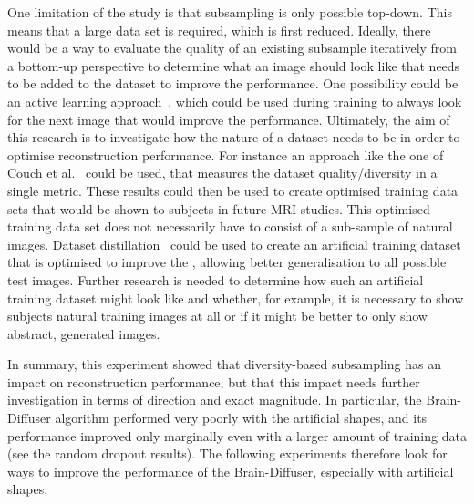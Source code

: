 One limitation of the study is that subsampling is only possible top-down. This means that a large data set is required, which is first reduced. Ideally, there would be a way to evaluate the quality of an existing subsample iteratively from a bottom-up perspective  to determine what an image should look like that needs to be added to the dataset to improve the performance. One possibility could be an active learning approach~\cite{senerActiveLearningConvolutional2018, guoDeepCoreComprehensiveLibrary2022}, which could be used during training to always look for the next image that would improve the performance. Ultimately, the aim of this research is to investigate how the nature of a dataset needs to be in order to optimise reconstruction performance. For instance an approach like the one of Couch et al.~\cite{couchSizeClassBalance2024} could be used, that measures the dataset quality/diversity in a single metric. These results could then be used to create optimised training data sets that would be shown to subjects in future MRI studies. This optimised training data set does not necessarily have to consist of a sub-sample of natural images. Dataset distillation~\cite{wangDatasetDistillation2018,yuDatasetDistillationComprehensive2024} could be used to create an artificial training dataset that is optimised to improve the , allowing better generalisation to all possible test images. Further research is needed to determine how such an artificial training dataset might look like and whether, for example, it is necessary to show subjects natural training images at all or if it might be better to only show abstract, generated images. 

In summary, this experiment showed that diversity-based subsampling has an impact on reconstruction performance, but that this impact needs further investigation in terms of direction and exact magnitude. In particular, the Brain-Diffuser algorithm performed very poorly with the artificial shapes, and its  performance improved only marginally even with a larger amount of training data (see the random dropout results). The following experiments therefore look for ways to improve the performance of the Brain-Diffuser, especially with artificial shapes.
